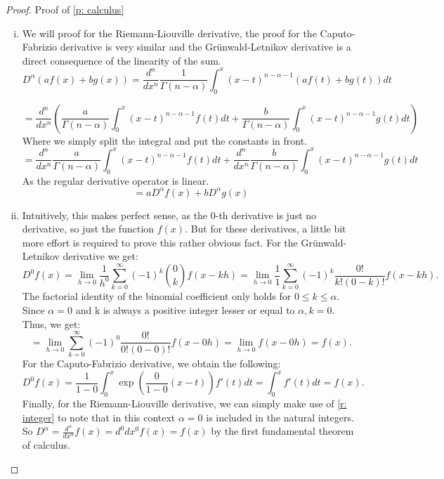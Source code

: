 \begin{proof}
    Proof of \ref{p: calculus}
    \begin{enumerate}[(i)]
        \item We will proof for the Riemann-Liouville derivative, the proof for the Caputo-Fabrizio derivative is very similar and the Grünwald-Letnikov derivative is a direct consequence of the linearity of the sum.
        \[ D^{\alpha} (a f(x) + b g(x)) = \frac{d^n}{dx^n}\frac{1}{\Gamma(n - \alpha)} \int_{0}^{x} (x - t)^{n - \alpha - 1} \left(a f(t) + b g(t)\right) dt \]
     
        \[= \frac{d^n}{dx^n}\left(\frac{a}{\Gamma(n - \alpha)} \int_{0}^{x} (x - t)^{n - \alpha - 1}  f(t)dt + \frac{b}{\Gamma(n - \alpha)} \int_{0}^{x} (x - t)^{n - \alpha - 1} g(t)dt\right) \] Where we simply split the integral and put the constants in front.
        \[= \frac{d^n}{dx^n}\frac{a}{\Gamma(n - \alpha)} \int_{0}^{x} (x - t)^{n - \alpha - 1}  f(t)dt + \frac{d^n}{dx^n} \frac{b}{\Gamma(n - \alpha)} \int_{0}^{x} (x - t)^{n - \alpha - 1} g(t)dt \] As the regular derivative operator is linear.
        \[ = a D^{\alpha} f(x) + b D^{\alpha} g(x) \]
        \item Intuitively, this makes perfect sense, as the 0-th derivative is just no derivative, so just the function \(f(x)\). But for these derivatives, a little bit more effort is required to prove this rather obvious fact.
        \newline 
        For the Grünwald-Letnikov derivative we get: \[D^0 f(x) = \lim_{h \to 0} \frac{1}{h^0} \sum_{k=0}^\infty (-1)^k \binom{0}{k} f(x - k h)
        = \lim_{h \to 0} \frac{1}{1} \sum_{k=0}^\infty (-1)^k \frac{0!}{k!(0- k)!} f(x - k h).\] The factorial identity of the binomial coefficient only holds for \(0 \leq k \leq \alpha\). Since \(\alpha = 0\) and k is always a positive integer lesser or equal to \(\alpha, k = 0\). Thus, we get:
        \[ = \lim_{h \to 0} \sum_{k=0}^\infty (-1)^0 \frac{0!}{0!(0- 0)!} f(x - 0 h) = \lim_{h \to 0} f(x - 0 h) = f(x).\]
        \newline
        For the Caputo-Fabrizio derivative, we obtain the following:
        \[ D^{0} f(x) = \frac{1}{1 - 0}  \int_{0}^{x} \exp\left(\frac{0}{1 -0}(x-t)\right) f'(t) dt = \int_{0}^{x}f'(t) dt = f(x).\]
        \newline
        Finally, for the Riemann-Liouville derivative, we can simply make use of \autoref{r: integer} to note that in this context \(\alpha = 0\) is included in the natural integers. So \( \displaystyle D^\alpha = \frac{d^\alpha}{dx^\alpha} f(x) = {d^0}{dx^0} f(x) = f(x)\) by the first fundamental theorem of calculus.


\end{enumerate}
\end{proof}
